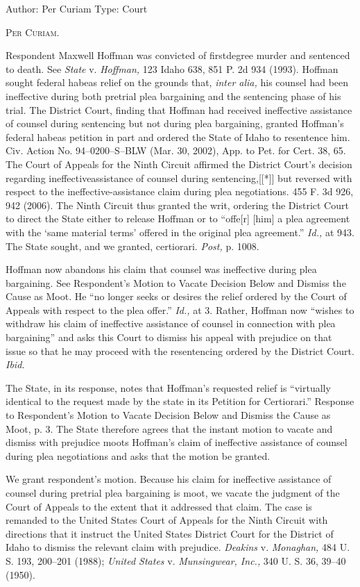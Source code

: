 Author: Per Curiam
\setcounter{page}{117}
Type: Court

  \textsc{Per Curiam.}

  Respondent Maxwell Hoffman was convicted of firstdegree murder and sentenced to death. See \emph{State} v. \emph{Hoffman,} 123 Idaho 638, 851 P. 2d 934 (1993). Hoffman sought federal habeas relief on the grounds that, \emph{inter alia,} his counsel had been ineffective during both pretrial plea bargaining and the sentencing phase of his trial. The District Court, finding that Hoffman had received ineffective assistance of counsel during sentencing but not during plea bargaining, granted Hoffman's federal habeas petition in part and ordered the State of Idaho to resentence him. Civ. Action No. 94--0200--S--BLW (Mar. 30, 2002), App. to Pet. for Cert. 38, 65. The Court of Appeals for the Ninth Circuit affirmed the District Court's decision regarding ineffective\newpage assistance of counsel during sentencing,[[*]] but reversed with respect to the ineffective-assistance claim during plea negotiations. 455 F. 3d 926, 942 (2006). The Ninth Circuit thus granted the writ, ordering the District Court to direct the State either to release Hoffman or to ``offe[r] [him] a plea agreement with the ‘same material terms' offered in the original plea agreement.'' \emph{Id.,} at 943. The State sought, and we granted, certiorari. \emph{Post,} p. 1008.

  Hoffman now abandons his claim that counsel was ineffective during plea bargaining. See Respondent's Motion to Vacate Decision Below and Dismiss the Cause as Moot. He ``no longer seeks or desires the relief ordered by the Court of Appeals with respect to the plea offer.'' \emph{Id.,} at 3. Rather, Hoffman now ``wishes to withdraw his claim of ineffective assistance of counsel in connection with plea bargaining'' and asks this Court to dismiss his appeal with prejudice on that issue so that he may proceed with the resentencing ordered by the District Court. \emph{Ibid.}

  The State, in its response, notes that Hoffman's requested relief is ``virtually identical to the request made by the state in its Petition for Certiorari.'' Response to Respondent's Motion to Vacate Decision Below and Dismiss the Cause as Moot, p. 3. The State therefore agrees that the instant motion to vacate and dismiss with prejudice moots Hoffman's claim of ineffective assistance of counsel during plea negotiations and asks that the motion be granted.

  We grant respondent's motion. Because his claim for ineffective assistance of counsel during pretrial plea bargaining is moot, we vacate the judgment of the Court of Appeals to the extent that it addressed that claim. The case is remanded to the United States Court of Appeals for the Ninth \newpage  Circuit with directions that it instruct the United States District Court for the District of Idaho to dismiss the relevant claim with prejudice. \emph{Deakins} v. \emph{Monaghan,} 484 U. S. 193, 200--201 (1988); \emph{United States} v. \emph{Munsingwear, Inc.,} 340 U. S. 36, 39--40 (1950).

